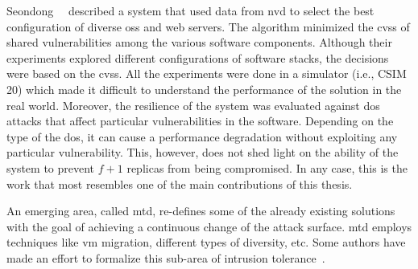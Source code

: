 Seondong~\etal{}~\cite{Seondong:2017} described a system that used data from \gls{nvd} to select the best configuration of diverse \glspl{os} and web servers.
The algorithm minimized the \gls{cvss} of shared vulnerabilities among the various software components.
Although their experiments explored different configurations of software stacks, the decisions were based on the \gls{cvss}.
All the experiments were done in a simulator (i.e., CSIM 20) which made it difficult to understand the performance of the solution in the real world.
Moreover, the resilience of the system was evaluated against \gls{dos} attacks that affect particular vulnerabilities in the software.
Depending on the type of the \gls{dos}, it can cause a performance degradation without exploiting any particular vulnerability.
This, however, does not shed light on the ability of the system to prevent $f+1$ replicas from being compromised.
In any case, this is the work that most resembles one of the main contributions of this thesis. 


An emerging area, called \gls{mtd}, re-defines some of the already existing solutions with the goal of achieving a continuous change of the attack surface. 
\gls{mtd} employs techniques like \gls{vm} migration, different types of diversity, etc.
Some authors have made an effort to formalize this sub-area of intrusion tolerance~\cite{Zhuang:2014}.

